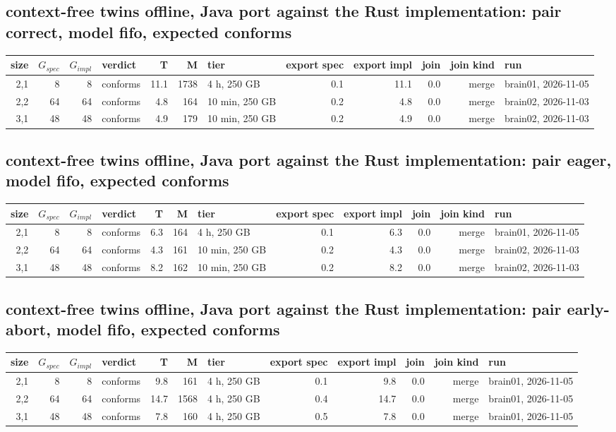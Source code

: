 \documentclass[10pt]{article}
\begin{document}
\subsection*{context-free twins offline, Java port against the Rust implementation: pair \textsf{correct}, model fifo, expected conforms}
\begin{longtable}{@{}rrrlrrlrrrrl@{}}
\toprule
size & $G_{\mathit{spec}}$ & $G_{\mathit{impl}}$ & verdict & T & M & tier & export spec & export impl & join & join kind & run \\
\midrule
\endhead
\color{blue} 2,1 & 8 & 8 & conforms & 11.1 & 1738 & 4 h, 250 GB & 0.1 & 11.1 & 0.0 & merge & brain01, 2026-11-05 \\
\color{blue} 2,2 & 64 & 64 & conforms & 4.8 & 164 & 10 min, 250 GB & 0.2 & 4.8 & 0.0 & merge & brain02, 2026-11-03 \\
\color{blue} 3,1 & 48 & 48 & conforms & 4.9 & 179 & 10 min, 250 GB & 0.2 & 4.9 & 0.0 & merge & brain02, 2026-11-03 \\
\bottomrule
\end{longtable}
\subsection*{context-free twins offline, Java port against the Rust implementation: pair \textsf{eager}, model fifo, expected conforms}
\begin{longtable}{@{}rrrlrrlrrrrl@{}}
\toprule
size & $G_{\mathit{spec}}$ & $G_{\mathit{impl}}$ & verdict & T & M & tier & export spec & export impl & join & join kind & run \\
\midrule
\endhead
\color{blue} 2,1 & 8 & 8 & conforms & 6.3 & 164 & 4 h, 250 GB & 0.1 & 6.3 & 0.0 & merge & brain01, 2026-11-05 \\
\color{blue} 2,2 & 64 & 64 & conforms & 4.3 & 161 & 10 min, 250 GB & 0.2 & 4.3 & 0.0 & merge & brain02, 2026-11-03 \\
\color{blue} 3,1 & 48 & 48 & conforms & 8.2 & 162 & 10 min, 250 GB & 0.2 & 8.2 & 0.0 & merge & brain02, 2026-11-03 \\
\bottomrule
\end{longtable}
\subsection*{context-free twins offline, Java port against the Rust implementation: pair \textsf{early-abort}, model fifo, expected conforms}
\begin{longtable}{@{}rrrlrrlrrrrl@{}}
\toprule
size & $G_{\mathit{spec}}$ & $G_{\mathit{impl}}$ & verdict & T & M & tier & export spec & export impl & join & join kind & run \\
\midrule
\endhead
\color{blue} 2,1 & 8 & 8 & conforms & 9.8 & 161 & 4 h, 250 GB & 0.1 & 9.8 & 0.0 & merge & brain01, 2026-11-05 \\
\color{blue} 2,2 & 64 & 64 & conforms & 14.7 & 1568 & 4 h, 250 GB & 0.4 & 14.7 & 0.0 & merge & brain01, 2026-11-05 \\
\color{blue} 3,1 & 48 & 48 & conforms & 7.8 & 160 & 4 h, 250 GB & 0.5 & 7.8 & 0.0 & merge & brain01, 2026-11-05 \\
\bottomrule
\end{longtable}
\end{document}
